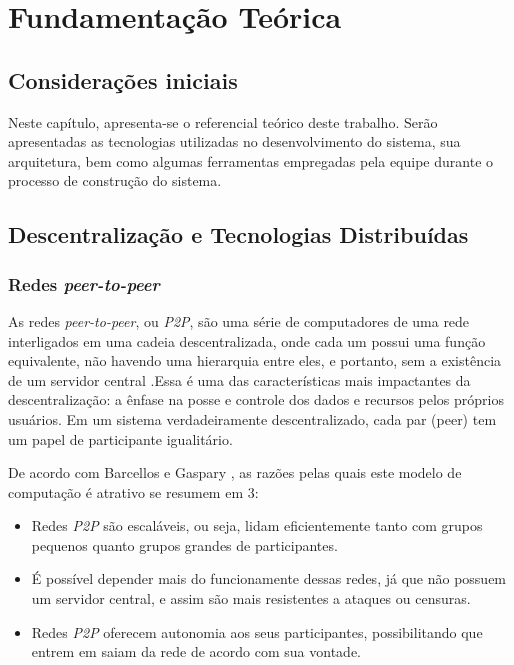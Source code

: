 \chapter[Fundamentação Teórica]{Fundamentação Teórica}
\label{cap:fundamentacao}

\section{Considerações iniciais}
Neste capítulo, apresenta-se o referencial teórico deste trabalho. Serão apresentadas as tecnologias utilizadas no desenvolvimento do sistema, sua arquitetura, bem como algumas ferramentas empregadas pela equipe durante o processo de construção do sistema.

\section{Descentralização e Tecnologias Distribuídas}
\subsection{Redes \textit{peer-to-peer}}
As redes \textit{peer-to-peer}, ou \textit{P2P}, são uma série de computadores de uma rede interligados em uma cadeia descentralizada, onde cada um possui uma função equivalente, não havendo uma hierarquia entre eles, e portanto, sem a existência de um servidor central \cite{otton2007}.Essa é uma das características mais impactantes da descentralização: a ênfase na posse e controle dos dados e recursos pelos próprios usuários. Em um sistema verdadeiramente descentralizado, cada par (peer) tem um papel de participante igualitário. \cite{oram2002}

De acordo com Barcellos e Gaspary \cite{barcellos2006}, as razões pelas quais este modelo de computação é atrativo se resumem em 3:
\begin{itemize}
    \item Redes \textit{P2P} são escaláveis, ou seja, lidam eficientemente tanto com grupos pequenos quanto grupos grandes de participantes. 
    \item É possível depender mais do funcionamente dessas redes, já que não possuem um servidor central, e assim são mais resistentes a ataques ou censuras.
    \item Redes \textit{P2P} oferecem autonomia aos seus participantes, possibilitando que entrem em saiam da rede de acordo com sua vontade. 
\end{itemize}

